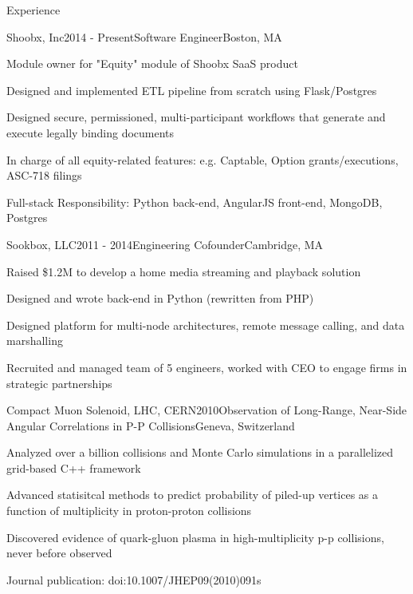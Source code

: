 \documentclass{resume}
\begin{document}

\begin{rSection}{Experience}

\begin{rSubsection}{Shoobx, Inc}{2014 - Present}{Software Engineer}{Boston, MA}
\item Module owner for "Equity" module of Shoobx SaaS product
\item Designed and implemented ETL pipeline from scratch using Flask/Postgres
\item Designed secure, permissioned, multi-participant workflows that generate and execute legally binding documents
\item In charge of all equity-related features: e.g. Captable, Option grants/executions, ASC-718 filings
\item Full-stack Responsibility: Python back-end, AngularJS front-end, MongoDB, Postgres
\end{rSubsection}

\begin{rSubsection}{Sookbox, LLC}{2011 - 2014}{Engineering Cofounder}{Cambridge, MA}
\item Raised \$1.2M to develop a home media streaming and playback solution
\item Designed and wrote back-end in Python (rewritten from PHP)
\item Designed platform for multi-node architectures, remote message calling, and data marshalling
\item Recruited and managed team of 5 engineers, worked with CEO to engage firms in strategic partnerships
\end{rSubsection}

\begin{rSubsection}{Compact Muon Solenoid, LHC, CERN}{2010}{Observation of Long-Range, Near-Side Angular Correlations in P-P Collisions}{Geneva, Switzerland}
\item Analyzed over a billion collisions and Monte Carlo simulations in a parallelized grid-based C++ framework
\item Advanced statisitcal methods to predict probability of piled-up vertices as a function of multiplicity in proton-proton collisions
\item Discovered evidence of quark-gluon plasma in high-multiplicity p-p collisions, never before observed
\item Journal publication: doi:10.1007/JHEP09(2010)091s
\end{rSubsection}

\end{rSection}
\end{document}
